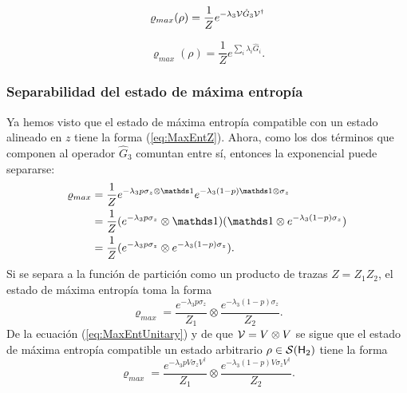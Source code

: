 \noindent\begin{minipage}{.5\linewidth}
    \begin{equation}\label{eq:MaxEntUnitary}
        \varrho_{max}(\rho)=\frac{1}{Z}e^{-\lambda_{3}\mathcal{V}\hat{G}_{3}\mathcal{V}^{\dag}}
    \end{equation}
    \end{minipage}%
    \begin{minipage}{.5\linewidth}
    \begin{equation}\label{eq:MaxEntLambdas}
        \varrho_{max}(\rho)=\frac{1}{Z}e^{\sum_{i}\lambda_{i}\hat{G}_{i}}.
    \end{equation}
    \end{minipage}

\subsubsection{Separabilidad del estado de máxima entropía}
Ya hemos visto que el estado de máxima entropía compatible con un estado alineado en $z$ tiene la forma (\ref{eq:MaxEntZ}). Ahora, como los dos términos que componen al operador $\hat{G}_{3}$ comuntan entre sí, entonces la exponencial puede separarse:
\begin{align*}
\varrho_{max}&=\frac{1}{Z}e^{-\lambda_{3}p\sigma_{z}\otimes\Id}e^{-\lambda_{3}(1-p)\Id\otimes\sigma_{z}}\\
&=\frac{1}{Z}(e^{-\lambda_{3}p\sigma_{z}}\otimes\Id)( \Id\otimes e^{-\lambda_{3}(1-p)\sigma_{z}})\\
&=\frac{1}{Z}(e^{-\lambda_{3}p\sigma_{z}}\otimes e^{-\lambda_{3}(1-p)\sigma_{z}}).\\
\end{align*}
Si se separa a la función de partición como un producto de trazas $Z=Z_{1}Z_{2}$, el estado de máxima entropía toma la forma
\begin{equation}\label{eq:MaxEntZ}
\varrho_{max}=\frac{e^{-\lambda_{3}p\sigma_{z}}}{Z_{1}} \otimes \frac{e^{-\lambda_{3}(1-p)\sigma_{z}}}{Z_{2}}.
\end{equation}
De la ecuación (\ref{eq:MaxEntUnitary}) y de que $\mathcal{V}=V\otimes V$ se sigue que el estado de máxima entropía compatible un estado arbitrario $\rho\in\mathcal{S}({\sf H}_{2})$ tiene la forma
\begin{equation}\label{eq:MaxEntSeparable}
    \varrho_{max}=\frac{e^{-\lambda_{3}pV\sigma_{z}V^{\dag}}}{Z_{1}} \otimes \frac{e^{-\lambda_{3}(1-p)V\sigma_{z}V^{\dag}}}{Z_{2}}.
\end{equation}

